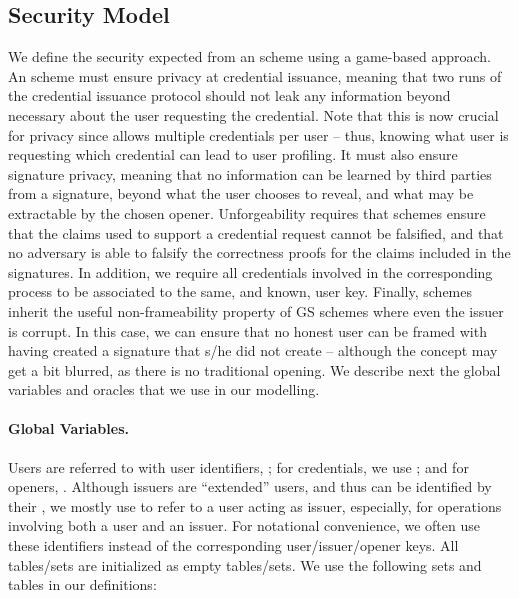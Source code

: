 \subsection{Security Model}
\label{ssec:model-uas}

We define the security expected from an \UAS scheme using a game-based approach.
An \UAS scheme must ensure privacy at credential issuance, meaning that two
runs of the credential issuance protocol should not leak any information beyond
necessary about the user requesting the credential. Note that this is now
crucial for privacy since \UAS allows multiple credentials per
user -- thus, knowing what user is requesting which credential can lead to user
profiling. It must also ensure signature privacy, meaning that no information
can be learned by third parties from a signature, beyond what the user chooses
to reveal, and what may be extractable by the chosen opener. Unforgeability
requires that \UAS schemes ensure that the claims used to support a credential
request cannot be falsified, and that no adversary is able to falsify the
correctness proofs for the claims included in the signatures. In addition, we
require all credentials involved in the corresponding process to be associated
to the same, and known, user key. Finally, \UAS schemes inherit the useful
non-frameability property of GS schemes where even the issuer is corrupt. In
this case, we can ensure that no honest user can be framed with having created a
signature that s/he did not create -- although the concept may get a bit
blurred, as there is no traditional opening.
%
We describe next the global variables and oracles that we use in our modelling.

\paragraph{Global Variables.} %
Users are referred to with user identifiers, \uid; for credentials, we use \cid;
and for openers, \oid. Although issuers are ``extended'' users, and thus can be
identified by their \uid, we mostly use \iid to refer to a user acting as
issuer, especially, for operations involving both a user and an issuer.
%
For notational convenience, we often use these identifiers instead of the
corresponding user/issuer/opener keys.
%
All tables/sets are initialized as empty tables/sets. We use the following sets
and tables in our definitions:

